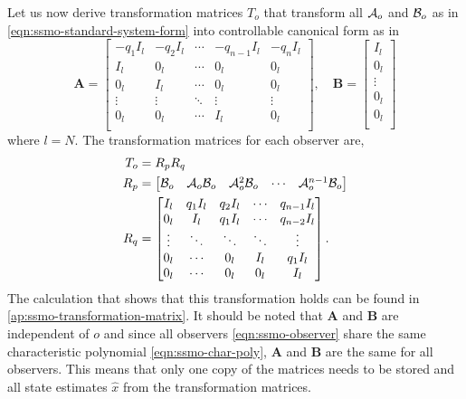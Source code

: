 Let us now derive transformation matrices $T_o$ that transform all $\mathcal{A}_o$ and $\mathcal{B}_o$ as in \eqref{eqn:ssmo-standard-system-form} into controllable canonical form as in \cite[Sec. 4.3.2]{Hespanha2018LinearTheory}
\begin{equation}\label{eqn:controllable-canonical-form}
    \mathbf{A} =
    \begin{bmatrix}
        -q_1I_l & -q_2I_l & \cdots & -q_{n-1}I_l & -q_nI_l \\
        I_l & 0_l & \cdots & 0_l & 0_l \\
        0_l & I_l & \cdots & 0_l & 0_l \\
        \vdots & \vdots & \ddots & \vdots & \vdots \\
        0_l & 0_l & \cdots & I_l & 0_l \\
    \end{bmatrix}, \quad
    \mathbf{B} = 
    \begin{bmatrix}
        I_l \\ 0_l \\ \vdots \\ 0_l \\ 0_l \\
    \end{bmatrix}
\end{equation}
where $l=N$. The transformation matrices for each observer are,
\begin{equation}\label{eqn:ssmo-transformation}
    \begin{split}
        T_o &= R_pR_q\\
        R_p &=
        \begin{bmatrix}
            \mathcal{B}_o & \mathcal{A}_o\mathcal{B}_o & \mathcal{A}^{2}_o\mathcal{B}_o & \cdots & \mathcal{A}^{n-1}_o\mathcal{B}_o \\
        \end{bmatrix} \\
        R_q &=
        \begin{bmatrix}
            I_l & q_1I_l & q_2I_l & \cdots & q_{n-1}I_l \\
            0_l & I_l & q_1I_l & \cdots & q_{n-2}I_l \\
            \vdots & \ddots & \ddots & \ddots & \vdots \\
            0_l & \cdots & 0_l & I_l & q_1I_l \\
            0_l & \cdots & 0_l & 0_l & I_l \\
        \end{bmatrix}.
    \end{split}
\end{equation}
The calculation that shows that this transformation holds can be found in \autoref{ap:ssmo-transformation-matrix}. It should be noted that $\mathbf{A}$ and $\mathbf{B}$ are independent of $o$ and since all observers \eqref{eqn:ssmo-observer} share the same characteristic polynomial \eqref{eqn:ssmo-char-poly}, $\mathbf{A}$ and $\mathbf{B}$ are the same for all observers. This means that only one copy of the matrices needs to be stored and all state estimates $\hat{x}$ from the transformation matrices.

